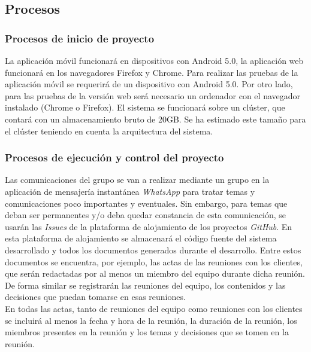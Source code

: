 \documentclass[12pt]{article}%
\begin{document}
\subsection{Procesos}

\subsubsection{Procesos de inicio de proyecto}

La aplicaci\'on m\'ovil funcionar\'a en dispositivos con Android 5.0, la aplicaci\'on web funcionar\'a en los navegadores Firefox y Chrome. Para realizar las pruebas de la aplicaci\'on m\'ovil se requerir\'a de un dispositivo con Android 5.0. Por otro lado, para las pruebas de la versi\'on web ser\'a necesario un ordenador con el navegador instalado (Chrome o Firefox). El sistema se funcionar\'a sobre un cl\'uster, que contar\'a con un almacenamiento bruto de 20GB. Se ha estimado este tama\~no para el cl\'uster teniendo en cuenta la arquitectura del sistema. 


\subsubsection{Procesos de ejecuci\'on y control del proyecto}

Las comunicaciones del grupo se van a realizar mediante un grupo en la aplicaci\'on de mensajer\'ia instant\'anea \textit{WhatsApp} para tratar temas y comunicaciones poco importantes y eventuales. Sin embargo, para temas que deban ser permanentes y/o deba quedar constancia de esta comunicaci\'on, se usar\'an las \textit{Issues} de la plataforma de alojamiento de los proyectos \textit{GitHub}. En esta plataforma de alojamiento se almacenar\'a el c\'odigo fuente del sistema desarrollado y todos los documentos generados durante el desarrollo. Entre estos documentos se encuentra, por ejemplo, las actas de las reuniones con los clientes, que ser\'an redactadas por al menos un miembro del equipo durante dicha reuni\'on. De forma similar se registrar\'an las reuniones del equipo, los contenidos y las decisiones que puedan tomarse en esas reuniones.\\

En todas las actas, tanto de reuniones del equipo como reuniones con los clientes se incluir\'a al menos la fecha y hora de la reuni\'on, la duraci\'on de la reuni\'on, los miembros presentes en la reuni\'on y los temas y decisiones que se tomen en la reuni\'on.\\
\end{document}

